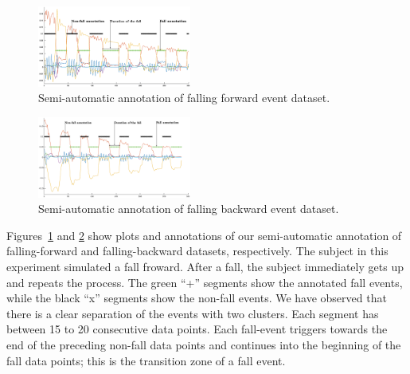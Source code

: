 \documentclass[]{IEEEtran}
\begin{document}
\begin{figure}[!tb]
\centering
\includegraphics[width=0.45\textwidth]{plots/human_falling_forward2.eps} 
\caption{Semi-automatic annotation of falling forward event dataset.}
 \label{fig:automatic_annotation} 
\end{figure}


\begin{figure}[!tb]
\centering
\includegraphics[width=0.45\textwidth]{plots/human_falling_backward2.eps} 
\caption{Semi-automatic annotation of falling backward event dataset.}
 \label{fig:automatic_annotation2} 
\end{figure}







Figures~\ref{fig:automatic_annotation} and \ref{fig:automatic_annotation2} show plots and annotations of our semi-automatic annotation of falling-forward  and falling-backward datasets, respectively. The subject in this experiment simulated a fall froward. After a 
fall, the subject immediately gets up and repeats the process. The green ``+'' segments 
show the annotated fall events, while the black ``x'' segments show the non-fall 
events. We have observed that there is a clear separation of the events with two 
clusters. Each segment has between 15 to 20 consecutive data points.
Each fall-event triggers 
towards the end of the preceding non-fall data points and continues into the beginning of the fall data points; this is the transition zone of a fall event.
\end{document}
